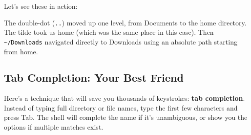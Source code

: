 \documentclass[
  letterpaper,
  DIV=11,
  numbers=noendperiod]{scrreprt}
\newenvironment{Shaded}{\begin{snugshade}}{\end{snugshade}}
\newcommand{\ExtensionTok}[1]{\textcolor[rgb]{0.00,0.23,0.31}{#1}}
\newcommand{\NormalTok}[1]{\textcolor[rgb]{0.00,0.23,0.31}{#1}}
\newcommand{\OperatorTok}[1]{\textcolor[rgb]{0.37,0.37,0.37}{#1}}
\begin{document}
Let's see these in action:

\begin{codelisting}

\caption{\texttt{terminal}}

\begin{Shaded}
\end{Shaded}

\end{codelisting}

The double-dot (\texttt{..}) moved up one level, from Documents to the
home directory. The tilde took us home (which was the same place in this
case). Then \texttt{\textasciitilde{}/Downloads} navigated directly to
Downloads using an absolute path starting from home.

\subsection{Tab Completion: Your Best
Friend}\label{tab-completion-your-best-friend}

Here's a technique that will save you thousands of keystrokes:
\textbf{tab completion}. Instead of typing full directory or file names,
type the first few characters and press Tab. The shell will complete the
name if it's unambiguous, or show you the options if multiple matches
exist.

\begin{codelisting}

\caption{\texttt{terminal}}

\begin{Shaded}
\end{Shaded}

\end{codelisting}
\end{document}
